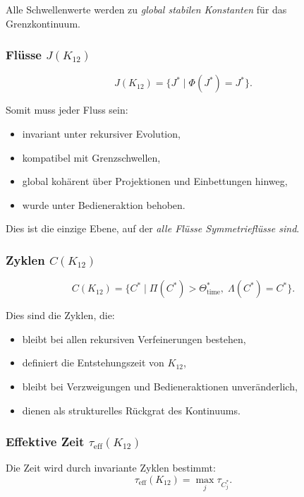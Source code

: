 Alle Schwellenwerte werden zu \emph{global stabilen Konstanten} für das Grenzkontinuum.

\subsubsection{Flüsse $J(K_{12})$}

\[
J(K_{12}) = \{J^*\mid \Phi(J^*)=J^*\}.
\]

Somit muss jeder Fluss sein:
\begin{itemize}
    \item invariant unter rekursiver Evolution,
    \item kompatibel mit Grenzschwellen,
    \item global kohärent über Projektionen und Einbettungen hinweg,
    \item wurde unter Bedieneraktion behoben.
\end{itemize}

Dies ist die einzige Ebene, auf der \emph{alle Flüsse Symmetrieflüsse sind}.

\subsubsection{Zyklen $C(K_{12})$}

\[
C(K_{12}) = \{ C^*\mid \Pi(C^*)>\Theta_{\mathrm{time}}^*,\;
\Lambda(C^*)=C^*\}.
\]

Dies sind die Zyklen, die:
\begin{itemize}
    \item bleibt bei allen rekursiven Verfeinerungen bestehen,
    \item definiert die Entstehungszeit von $K_{12}$,
    \item bleibt bei Verzweigungen und Bedieneraktionen unveränderlich,
    \item dienen als strukturelles Rückgrat des Kontinuums.
\end{itemize}

\subsubsection{Effektive Zeit $\tau_{\mathrm{eff}}(K_{12})$}

Die Zeit wird durch invariante Zyklen bestimmt:
\[
\tau_{\mathrm{eff}}(K_{12}) = \max_j \tau_{C_j^*}.
\]


